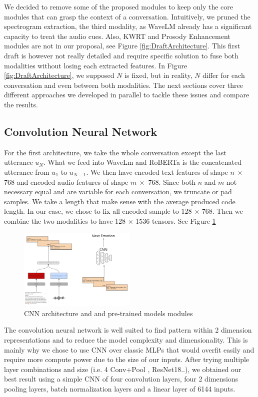 \documentclass{article}
\begin{document}
We decided to remove some of the proposed modules to keep only the core modules that can grasp the context of a conversation. Intuitively, we pruned the spectrogram extraction, the third modality, as WaveLM already has a significant capacity to treat the audio cues.
Also, KWRT and Prosody Enhancement modules are not in our proposal, see Figure \ref{fig:DraftArchitecture}. This first draft is however not really detailed and require specific solution to fuse both modalities without losing each extracted features. In Figure \ref{fig:DraftArchitecture}, we supposed $N$ is fixed, but in reality, $N$ differ for each conversation and even between both modalities. The next sections cover three different approaches we developed in parallel to tackle these issues and compare the results.


\subsection{Convolution Neural Network}
For the first architecture, we take the whole conversation except the last utterance $u_N$. What we feed into WaveLm and RoBERTa is the concatenated utterance from $u_1$ to $u_{N-1}$.
We then have encoded text features of shape $n \ \times$ 768 and encoded audio features of shape $m \ \times$ 768. Since both $n$ and $m$ not necessary equal and are variable for each conversation, we truncate or pad samples. We take a length that make sense with the average produced code length. In our case, we chose to fix all encoded sample to 128 $\times$ 768. Then we combine the two modalities to have 128 $\times$ 1536 tensors. See Figure \ref{fig:cnn_architecture}

\begin{figure}[tbp]
  \centering
  \includegraphics[width=0.5\textwidth]{Images/cnn_architecture.png}
  \caption{CNN architecture and and pre-trained models modules}
  \label{fig:cnn_architecture}
\end{figure}

The convolution neural network is well suited to find pattern within 2 dimension representations and to reduce the model complexity and dimensionality. This is mainly why we chose to use CNN over classic MLPs that would overfit easily and require more compute power due to the size of our inputs.
After trying multiple layer combinations and size (i.e. 4 Conv+Pool , ResNet18..), we obtained our best result using a simple CNN of four convolution layers, four 2 dimensions pooling layers, batch normalization layers and a linear layer of 6144 inputs.
\end{document}
